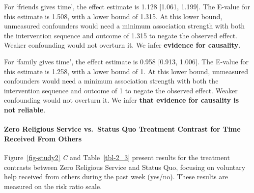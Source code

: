 \documentclass[
  single column]{article}
\let\oldparagraph\paragraph
\renewcommand{\paragraph}[1]{\oldparagraph{#1}\mbox{}}
\begin{document}
For `friends gives time', the effect estimate is 1.128 {[}1.061,
1.199{]}. The E-value for this estimate is 1.508, with a lower bound of
1.315. At this lower bound, unmeasured confounders would need a minimum
association strength with both the intervention sequence and outcome of
1.315 to negate the observed effect. Weaker confounding would not
overturn it. We infer \textbf{evidence for causality}.

For `family gives time', the effect estimate is 0.958 {[}0.913,
1.006{]}. The E-value for this estimate is 1.258, with a lower bound of
1. At this lower bound, unmeasured confounders would need a minimum
association strength with both the intervention sequence and outcome of
1 to negate the observed effect. Weaker confounding would not overturn
it. We infer \textbf{that evidence for causality is not reliable}.

\paragraph{Zero Religious Service vs.~Status Quo Treatment Contrast for
Time Received From
Others}\label{zero-religious-service-vs.-status-quo-treatment-contrast-for-time-received-from-others}

Figure~\ref{fig-study2} \emph{C} and Table~\ref{tbl-2_3} present results
for the treatment contrasts between Zero Religious Service and Status
Quo, focusing on voluntary help received from others during the past
week (yes/no). These results are measured on the risk ratio scale.
\end{document}

